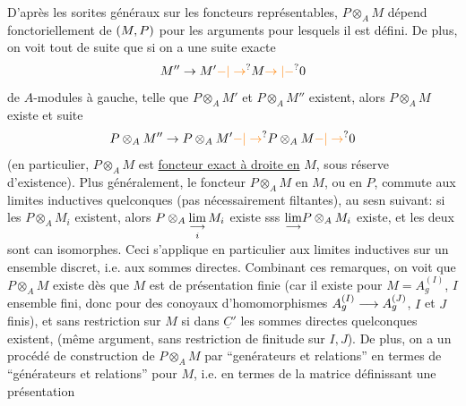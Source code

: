 D'après les sorites généraux sur les foncteurs représentables, $P\otimes_A M$
dépend fonctoriellement de $(M,P)$   pour les arguments pour
lesquels il est défini. De plus, on voit tout de suite que si on a une
suite exacte
\[
M''\handwritten{\to}M'\handwritten{\unsure{-|\to}}M\handwritten{\unsure{\to|-}}0
\]
de $A$-modules à gauche, telle que $P\otimes_A M'$ et $P\otimes_A M''$ existent, alors $P\otimes_A M$
existe et  suite 
\[
P\otimes_A M''\handwritten{\to}P\otimes_A M'\handwritten{\unsure{-|\to}}P\otimes_A M\handwritten{\unsure{-|\to}}0
\]
 (en particulier, $P\otimes_A M$ est \uline{foncteur exact à droite en} $M$, sous réserve
d'existence).
 Plus généralement, le foncteur
$P\otimes_A M$ en $M$, ou en $P$, commute aux limites inductives quelconques (pas nécessairement filtantes), au sesn suivant: si les $P\otimes_A M_i$ existent, 
alors $P\otimes_A\mathop{\underset{\longrightarrow}{\lim}}\limits_{i}M_i$ existe sss $\underset{\longrightarrow}{\lim}P\otimes_A M_i$ existe, et les deux sont can isomorphes. Ceci s'applique en particulier aux limites inductives sur un ensemble discret, i.e. aux sommes directes.
Combinant ces remarques, on voit
que $P\otimes_A M$ existe  dès que $M$ est de présentation finie (car il
existe pour $M=A_g^{(I)}$, $I$ ensemble fini, donc pour des conoyaux d'homomorphismes $A_g^{(I)}\longrightarrow A_g^{(J)}$, $I$ et $J$ finis), et sans restriction sur $M$ si dans $\underline C'$
les sommes directes quelconques existent, (même argument, sans restriction
de finitude sur $I,J$). De plus, on a un procédé de construction de $P\otimes_A M$
par ``genérateurs et relations'' en termes de ``générateurs et relations''
pour $M$, i.e. en termes  de la matrice définissant une présentation
